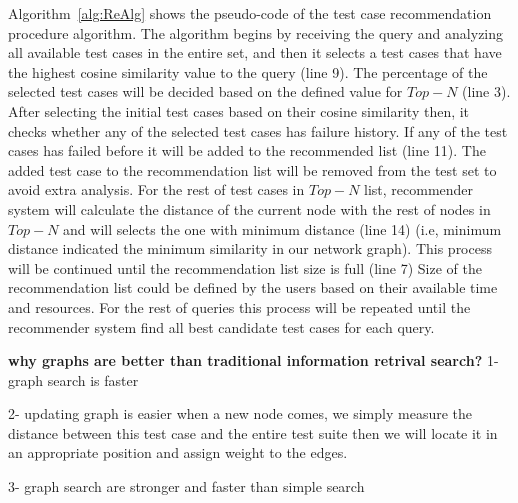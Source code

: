 Algorithm~\ref{alg:ReAlg} shows the pseudo-code of the test case
recommendation procedure algorithm. 
The algorithm begins by receiving the query and analyzing all available
test cases in the entire set, and then it selects a test cases that have the
highest cosine similarity value to the query (line 9).
The percentage of the selected test cases will be decided based on the 
defined value for $Top-N$ (line 3). 
After selecting the initial test cases based on their cosine similarity
then, it checks whether any of the selected test cases has failure history.
If any of the test cases has failed before it will be added to the recommended list (line 11).
The added test case to the recommendation list will be removed from the 
test set to avoid extra analysis.
For the rest of test cases in $Top-N$ list, recommender system will 
calculate the distance of the current node with the rest of nodes 
in $Top-N$ and will selects the one with minimum distance (line 14) (i.e, minimum distance
indicated the minimum similarity in our network graph). 
This process will be continued until the recommendation list size is full (line 7)
Size of the recommendation list could be defined by the users based on their available 
time and resources. 
For the rest of queries this process will be repeated until 
the recommender system find all best candidate test cases for each query. 




\textbf{why graphs are better than traditional information retrival search?}
1- graph search is faster

2- updating graph is easier
when a new node comes, we simply measure the distance between this test
case and the entire test suite then we will locate it in an appropriate position
and assign weight to the edges.

3- graph search are stronger and faster than simple search 

